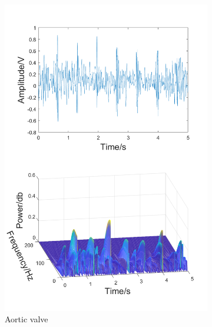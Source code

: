 \begin{figure}[h]
\begin{subfigure}{.3\linewidth}
        \includegraphics[width=1\linewidth]{figs/disscussion/b.png}
        \caption{Aortic valve}
        \label{FIG:Time&Frequency.b}
    \end{subfigure}\hfill
    \begin{subfigure}{.3\linewidth}
        \centering

\end{subfigure}
\end{figure}
